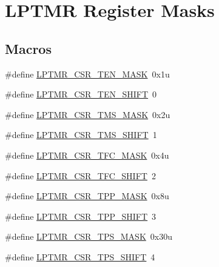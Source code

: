 \hypertarget{group___l_p_t_m_r___register___masks}{}\section{L\+P\+T\+MR Register Masks}
\label{group___l_p_t_m_r___register___masks}
\subsection*{Macros}
\begin{DoxyCompactItemize}
\item 
\#define \hyperlink{group___l_p_t_m_r___register___masks_ga4ed197f1cb8d0e954324b4854ff14a83}{L\+P\+T\+M\+R\+\_\+\+C\+S\+R\+\_\+\+T\+E\+N\+\_\+\+M\+A\+SK}~0x1u
\item 
\#define \hyperlink{group___l_p_t_m_r___register___masks_gada00f24f79b11a91e8404b4531d66733}{L\+P\+T\+M\+R\+\_\+\+C\+S\+R\+\_\+\+T\+E\+N\+\_\+\+S\+H\+I\+FT}~0
\item 
\#define \hyperlink{group___l_p_t_m_r___register___masks_ga57ee593a57d844d7bb4b87c127765558}{L\+P\+T\+M\+R\+\_\+\+C\+S\+R\+\_\+\+T\+M\+S\+\_\+\+M\+A\+SK}~0x2u
\item 
\#define \hyperlink{group___l_p_t_m_r___register___masks_gaeac406c6a48e15c6ec5784fb891b51b6}{L\+P\+T\+M\+R\+\_\+\+C\+S\+R\+\_\+\+T\+M\+S\+\_\+\+S\+H\+I\+FT}~1
\item 
\#define \hyperlink{group___l_p_t_m_r___register___masks_gaca581598c0f319b0002deda730479842}{L\+P\+T\+M\+R\+\_\+\+C\+S\+R\+\_\+\+T\+F\+C\+\_\+\+M\+A\+SK}~0x4u
\item 
\#define \hyperlink{group___l_p_t_m_r___register___masks_gaee3d1b59f30f6217f1f74b18cf973c4a}{L\+P\+T\+M\+R\+\_\+\+C\+S\+R\+\_\+\+T\+F\+C\+\_\+\+S\+H\+I\+FT}~2
\item 
\#define \hyperlink{group___l_p_t_m_r___register___masks_ga020eee1550f2943c10d51f8b56930e62}{L\+P\+T\+M\+R\+\_\+\+C\+S\+R\+\_\+\+T\+P\+P\+\_\+\+M\+A\+SK}~0x8u
\item 
\#define \hyperlink{group___l_p_t_m_r___register___masks_ga62be70d70bd4e88e26e5cc8437f6fd55}{L\+P\+T\+M\+R\+\_\+\+C\+S\+R\+\_\+\+T\+P\+P\+\_\+\+S\+H\+I\+FT}~3
\item 
\#define \hyperlink{group___l_p_t_m_r___register___masks_ga3502ccff1cbdb70bb99b73c035ab1e19}{L\+P\+T\+M\+R\+\_\+\+C\+S\+R\+\_\+\+T\+P\+S\+\_\+\+M\+A\+SK}~0x30u
\item 
\#define \hyperlink{group___l_p_t_m_r___register___masks_ga7759d842742bfedd91788d41ef12fb8d}{L\+P\+T\+M\+R\+\_\+\+C\+S\+R\+\_\+\+T\+P\+S\+\_\+\+S\+H\+I\+FT}~4

\end{DoxyCompactItemize}
